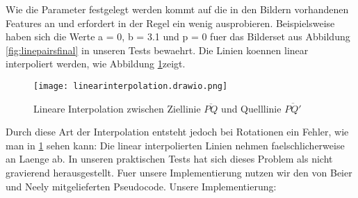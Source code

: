 Wie die Parameter festgelegt werden kommt auf die in den Bildern
vorhandenen Features an und erfordert in der Regel ein wenig
ausprobieren. Beispielsweise haben sich die Werte 
a = 0, b = 3.1 und p = 0 fuer das Bilderset aus Abbildung
\ref{fig:linepairsfinal} in unseren Tests bewaehrt.
Die Linien koennen linear interpoliert werden, wie Abbildung \ref{fig:linearinterpolation}zeigt. 
\begin{figure}[htb]
	\centering
	\texttt{[image: linearinterpolation.drawio.png]}
	\caption{Lineare Interpolation zwischen Ziellinie $\overline{PQ}$ und Quelllinie $\overline{PQ'}$}
	\label{fig:linearinterpolation}
\end{figure}
Durch diese Art der Interpolation entsteht jedoch bei
Rotationen ein Fehler, wie man in \ref{fig:linearinterpolation} sehen kann: Die linear
interpolierten Linien nehmen faelschlicherweise
an Laenge ab. In unseren praktischen Tests hat sich
dieses Problem als nicht gravierend herausgestellt.
Fuer unsere Implementierung nutzen wir den von Beier und Neely
mitgelieferten Pseudocode. Unsere Implementierung:

\clearpage

